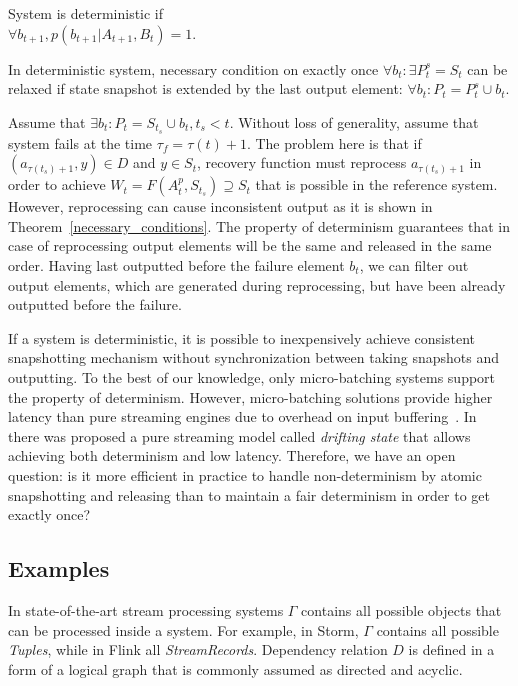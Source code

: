 \begin{definition}{System is deterministic}
if\\ 
$\forall{b_{t+1}},p(b_{t+1}|A_{t+1},B_t)=1$.
\end{definition}

\begin{theorem}
\label{determinism}
In deterministic system, necessary condition on exactly once $\forall{b_t} : \exists{P^{s}_t=S_t}$ can be relaxed if state snapshot is extended by the last output element: $\forall{b_t}:P_t=P^{s}_t \cup b_t$.
\end{theorem}
\begin{sketch}
Assume that $\exists{b_t}:P_t = S_{t_s} \cup b_t, t_s < t$. Without loss of generality, assume that system fails at the time $\tau_f = \tau(t)+1$. The problem here is that if $(a_{\tau(t_s)+1},y)\in{D}$ and $y\in{S_t}$, recovery function must reprocess $a_{\tau(t_s)+1}$ in order to achieve $W_t=F(A^{p}_t,S_{t_s})\supseteq{S_t}$ that is possible in the reference system. However, reprocessing can cause inconsistent output as it is shown in Theorem~\ref{necessary_conditions}. The property of determinism guarantees that in case of reprocessing output elements will be the same and released in the same order. Having last outputted before the failure element $b_t$, we can filter out output elements, which are generated during reprocessing, but have been already outputted before the failure.
\end{sketch}

If a system is deterministic, it is possible to inexpensively achieve consistent snapshotting mechanism without synchronization between taking snapshots and outputting. To the best of our knowledge, only micro-batching systems support the property of determinism. However, micro-batching solutions provide higher latency than pure streaming engines due to overhead on input buffering~\cite{karimov2018benchmarking}. In~\cite{we2018adbis} there was proposed a pure streaming model called {\em drifting state} that allows achieving both determinism and low latency. Therefore, we have an open question: is it more efficient in practice to handle non-determinism by atomic snapshotting and releasing than to maintain a fair determinism in order to get exactly once?  

\subsection{Examples}

In state-of-the-art stream processing systems $\Gamma$ contains all possible objects that can be processed inside a system. For example, in Storm, $\Gamma$ contains all possible {\em Tuples}, while in Flink all {\em StreamRecords}. Dependency relation $D$ is defined in a form of a logical graph that is commonly assumed as directed and acyclic.


